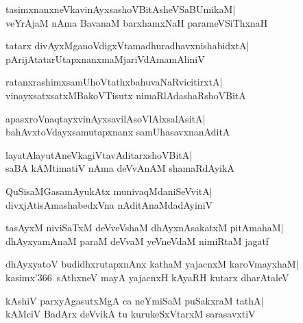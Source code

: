 \documentclass[twoside,12pt,openright]{book}
\newcounter{shloka}[chapter]
\begin{document}
\begin{shloka}%
tasimxnanxneVkavinAyxsashoVBitAsheVSaBUmikaM|\\
veYrAjaM nAma BavanaM barxhamxNaH parameVSiThxnaH
\end{shloka}

\begin{shloka}%
tatarx divAyxMganoVdigxVtamadhuradhavxnishabidxtA|\\
pArijAtatarUtapxnanxmaMjariVdAmamAliniV
\end{shloka}

\begin{shloka}%
ratanxrashimxsamUhoVtathxbahuvaNaRvicitirxtA|\\
vinayxsatxsatxMBakoVTisutx nimaRlAdashaRshoVBitA
\end{shloka}

\begin{shloka}%
apasxroVnaqtayxvinAyxsavilAsoVlAlxsalAsitA|\\
bahAvxtoVdayxsamutapxnanx samUhasavxnanAditA
\end{shloka}

\begin{shloka}%
layatAlayutAneVkagiVtavAditarxshoVBitA|\\
saBA kAMtimatiV nAma deVvAnAM shamaRdAyikA
\end{shloka}

\begin{shloka}%
QuSisaMGasamAyukAtx munivaqMdaniSeVvitA|\\
divxjAtisAmashabedxVna nAditAnaMdadAyiniV
\end{shloka}

\begin{shloka}%
tasAyxM niviSaTxM deVveVshaM dhAyxnAsakatxM pitAmahaM|\\
dhAyxyamAnaM paraM deVvaM yeVneVdaM nimiRtaM jagatf
\end{shloka}

\begin{shloka}%
dhAyxyatoV budidhxrutapxnAnx kathaM yajacnxM karoVmayxhaM|\\
kasimx\char'366\ sAthxneV mayA yajacnxH kAyaRH kutarx dharAtaleV
\end{shloka}

\begin{shloka}%
kAshiV parxyAgasutxMgA ca neYmiSaM puSakxraM tathA|\\
kAMciV BadArx deVvikA tu kurukeSxVtarxM sarasavxtiV
\end{shloka}
\end{document}
